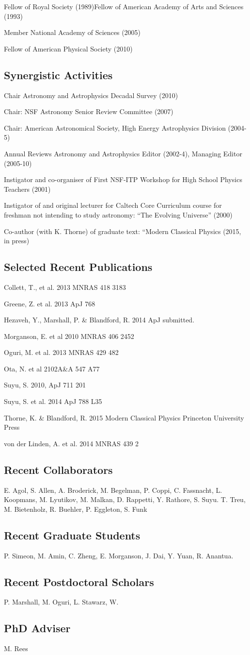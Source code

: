 Fellow of Royal Society (1989)Fellow of American Academy of Arts and Sciences (1993)

Member National Academy of Sciences (2005)

Fellow of American Physical Society (2010)

\subsection*{Synergistic Activities}
Chair Astronomy and Astrophysics Decadal Survey (2010)

Chair: NSF Astronomy Senior Review Committee (2007)

Chair: American Astronomical Society, High Energy Astrophysics Division (2004-5)

Annual Reviews Astronomy and Astrophysics Editor (2002-4), Managing Editor (2005-10)

Instigator and co-organiser of First NSF-ITP Workshop for High School Physics Teachers (2001)

Instigator of and original lecturer for Caltech Core Curriculum course for freshman not intending to study astronomy:  ``The Evolving Universe'' (2000)

Co-author (with K. Thorne) of graduate text: ``Modern Classical Physics (2015, in press)

\vfill\eject

\subsection*{Selected Recent Publications}
Collett, T., et al. 2013 MNRAS 418 3183

Greene, Z. et al. 2013 ApJ 768

Hezaveh, Y., Marshall, P. \& Blandford, R. 2014 ApJ submitted.

Morganson, E. et al 2010 MNRAS 406 2452

Oguri, M. et al. 2013 MNRAS 429 482

Ota, N.  et al 2102A\&A 547 A77

Suyu, S. 2010, ApJ 711 201

Suyu, S. et al. 2014 ApJ 788 L35

Thorne, K. \& Blandford, R. 2015 Modern Classical Physics Princeton University Press

von der Linden, A. et al. 2014 MNRAS 439 2

\subsection*{Recent Collaborators}
E. Agol, S. Allen,  A. Broderick, M. Begelman, P. Coppi, C. Fassnacht,  L. Koopmans,  M. Lyutikov, M. Malkan,  D. Rappetti, Y. Rathore, S. Suyu. T. Treu, M. Bietenholz, R. Buehler, P. Eggleton, S. Funk
\subsection*{Recent Graduate Students}
P. Simeon, M. Amin, C. Zheng, E. Morganson, J. Dai, Y. Yuan, R. Anantua.
\subsection*{Recent Postdoctoral Scholars}
P. Marshall, M. Oguri, L. Stawarz, W.
\subsection*{PhD Adviser} 	
M. Rees

